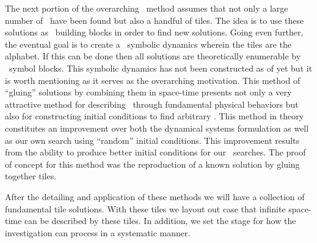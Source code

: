 \begin{description}
{%
The next portion of the overarching \spt\ method assumes that not only a
large number of \twots\ have been found but also a handful of tiles.
The idea is to use these solutions as \spt\ building blocks in order to find new
solutions. Going even further, the eventual goal is to create a \spt\ symbolic dynamics
wherein the tiles are the alphabet. If this can be done then all solutions
are theoretically enumerable by \spt\ symbol blocks. This symbolic dynamics
has not been constructed as of yet but it is worth mentioning as it
serves as the overarching motivation.
This method of ``gluing'' solutions by combining them in space-time
presents not only a very attractive method for describing
\twots\ through fundamental physical behaviors but also for constructing
initial conditions to find arbitrary \twots.
This method in theory constitutes an improvement over both the dynamical systems formulation
as well as our own search using ``random'' initial conditions. This improvement
results from the ability to produce better initial conditions for our \spt\ searches.
The proof of concept for this method was the reproduction of a known
solution by gluing together tiles.

After the detailing and application of these methods we will have a
collection of fundamental tile solutions. With these tiles we layout out
case that infinite space-time can be described by these tiles. In addition,
we set the stage for how the investigation can process in a systematic manner.

}

\end{description}
